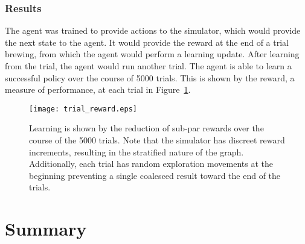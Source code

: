 \documentclass[draftclsnofoot,onecolumn,letterpaper,10pt]{IEEEtran}
\begin{document}
\subsubsection{Results}\label{sec:AI-Results}
The agent was trained to provide actions to the simulator, which would provide the next state to the agent. It would provide the reward at the end of a trial brewing, from which the agent would perform a learning update. After learning from the trial, the agent would run another trial. The agent is able to learn a successful policy over the course of 5000 trials. This is shown by the reward, a measure of performance, at each trial in Figure~\ref{fig:trial_graph}. 
\begin{figure}[h]
\label{fig:trial_graph}
\caption{Learning is shown by the reduction of sub-par rewards over the course of the 5000 trials. Note that the simulator has discreet reward increments, resulting in the stratified nature of the graph. Additionally, each trial has random exploration movements at the beginning preventing a single coalesced result toward the end of the trials.}
\texttt{[image: trial\_reward.eps]}
\end{figure}


\section{Summary}
\end{document}
